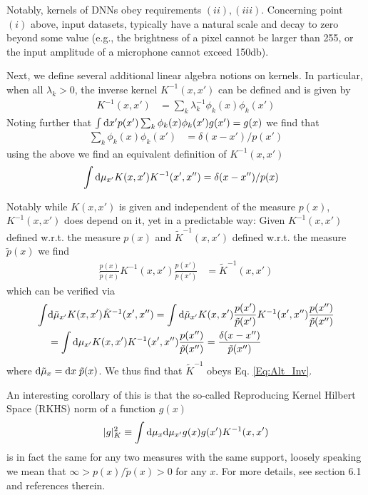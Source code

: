 Notably, kernels of DNNs obey requirements $(ii),(iii)$. Concerning point $(i)$ above, input datasets, typically have a natural scale and decay to zero beyond some value (e.g., the brightness of a pixel cannot be larger than 255, or the input amplitude of a microphone cannot exceed 150db). 

Next, we define several additional linear algebra notions on kernels. In particular, when all $\lambda_k > 0$, the inverse kernel $K^{-1}(x,x')$ can be defined and is given by 
\begin{align}
K^{-1}(x,x') &= \sum_k \lambda_k^{-1} \phi_k(x) \phi_{k}(x')  
\end{align}
Noting further that $\int \text{d} x' p(x') \sum_k \phi_k(x) \phi_k(x') g(x')= g(x)$ we find that 
\begin{align}
\sum_k \phi_k(x) \phi_{k}(x') &= \delta(x-x')/p(x') 
\end{align}
using the above we find an equivalent definition of $K^{-1}(x,x')$
\begin{align}
\label{Eq:Alt_Inv}
\int \text{d}\mu_{x'} K(x,x') K^{-1}(x',x'') &= \delta(x-x'')/p(x) 
\end{align}

Notably while $K(x,x')$ is given and independent of the measure $p(x)$, $K^{-1}(x,x')$ does depend on it, yet in a predictable way: Given $K^{-1}(x,x')$ defined w.r.t. the measure $p(x)$ and $\tilde{K}^{-1}(x,x')$ defined w.r.t. the measure $\tilde{p}(x)$ we find
\begin{align}
\frac{p(x)}{\tilde{p}(x)}K^{-1}(x,x') \frac{p(x')}{\tilde{p}(x')}&= \tilde{K}^{-1}(x,x')
\end{align}
which can be verified via 
\begin{align}\int &\text{d}\tilde{\mu}_{x'}K(x,x') \tilde{K}^{-1}(x',x'')=\int \text{d}\tilde{\mu}_{x'}K(x,x')\frac{p(x')}{\tilde{p}(x')} K^{-1}(x',x'')\frac{p(x'')}{\tilde{p}(x'')}\\ \nonumber &=\int \text{d}\mu_{x'}K(x,x') K^{-1}(x',x'')\frac{p(x'')}{\tilde{p}(x'')}=\frac{\delta(x-x'')}{\tilde{p}(x'')}\end{align} where $\text{d}\tilde{\mu}_x=\text{d} x \; \tilde{p}(x)$. We thus find that $\tilde{K}^{-1}$ obeys Eq. \ref{Eq:Alt_Inv}.  

An interesting corollary of this is that the so-called Reproducing Kernel Hilbert Space (RKHS) norm of a function $g(x)$ 
\begin{align}
\label{Eq:RKHS}
|g|_K^2 \equiv \int \text{d}\mu_x \text{d}\mu_{x'} g(x) g(x') K^{-1}(x,x')
\end{align}
is in fact the same for any two measures with the same support, loosely speaking we mean that $\infty>p(x)/\tilde{p}(x) > 0$ for any $x$. For more details, see \cite{Rasmussen2005} section 6.1 and references therein.

